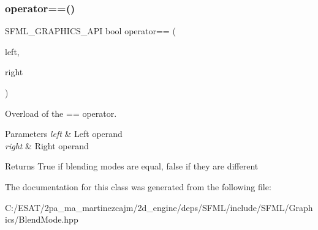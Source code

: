 \subsubsection{\texorpdfstring{operator==()}{operator==()}}
{\footnotesize\ttfamily S\+F\+M\+L\+\_\+\+G\+R\+A\+P\+H\+I\+C\+S\+\_\+\+A\+PI bool operator== (\begin{DoxyParamCaption}\item[{const \hyperlink{structsf_1_1_blend_mode}{Blend\+Mode} \&}]{left,  }\item[{const \hyperlink{structsf_1_1_blend_mode}{Blend\+Mode} \&}]{right }\end{DoxyParamCaption})\hspace{0.3cm}{\ttfamily [related]}}



Overload of the == operator. 


\begin{DoxyParams}{Parameters}
{\em left} & Left operand \\
\hline
{\em right} & Right operand\\
\hline
\end{DoxyParams}
\begin{DoxyReturn}{Returns}
True if blending modes are equal, false if they are different 
\end{DoxyReturn}


The documentation for this class was generated from the following file\+:\begin{DoxyCompactItemize}
\item 
C\+:/\+E\+S\+A\+T/2pa\+\_\+ma\+\_\+martinezcajm/2d\+\_\+engine/deps/\+S\+F\+M\+L/include/\+S\+F\+M\+L/\+Graphics/Blend\+Mode.\+hpp\end{DoxyCompactItemize}
